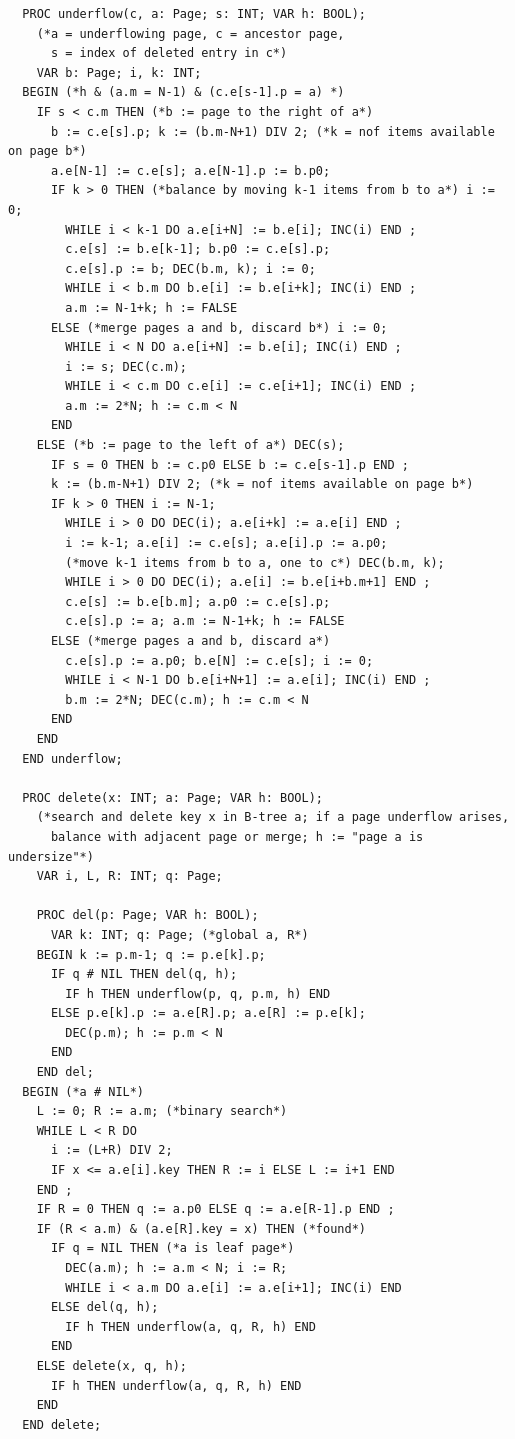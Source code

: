 \begin{verbatim}
  PROC underflow(c, a: Page; s: INT; VAR h: BOOL);
    (*a = underflowing page, c = ancestor page,
      s = index of deleted entry in c*)
    VAR b: Page; i, k: INT;
  BEGIN (*h & (a.m = N-1) & (c.e[s-1].p = a) *)
    IF s < c.m THEN (*b := page to the right of a*)
      b := c.e[s].p; k := (b.m-N+1) DIV 2; (*k = nof items available on page b*)
      a.e[N-1] := c.e[s]; a.e[N-1].p := b.p0;
      IF k > 0 THEN (*balance by moving k-1 items from b to a*) i := 0;
        WHILE i < k-1 DO a.e[i+N] := b.e[i]; INC(i) END ;
        c.e[s] := b.e[k-1]; b.p0 := c.e[s].p;
        c.e[s].p := b; DEC(b.m, k); i := 0;
        WHILE i < b.m DO b.e[i] := b.e[i+k]; INC(i) END ;
        a.m := N-1+k; h := FALSE
      ELSE (*merge pages a and b, discard b*) i := 0;
        WHILE i < N DO a.e[i+N] := b.e[i]; INC(i) END ;
        i := s; DEC(c.m);
        WHILE i < c.m DO c.e[i] := c.e[i+1]; INC(i) END ;
        a.m := 2*N; h := c.m < N
      END
    ELSE (*b := page to the left of a*) DEC(s);
      IF s = 0 THEN b := c.p0 ELSE b := c.e[s-1].p END ;
      k := (b.m-N+1) DIV 2; (*k = nof items available on page b*)
      IF k > 0 THEN i := N-1;
        WHILE i > 0 DO DEC(i); a.e[i+k] := a.e[i] END ;
        i := k-1; a.e[i] := c.e[s]; a.e[i].p := a.p0;
        (*move k-1 items from b to a, one to c*) DEC(b.m, k);
        WHILE i > 0 DO DEC(i); a.e[i] := b.e[i+b.m+1] END ;
        c.e[s] := b.e[b.m]; a.p0 := c.e[s].p;
        c.e[s].p := a; a.m := N-1+k; h := FALSE
      ELSE (*merge pages a and b, discard a*)
        c.e[s].p := a.p0; b.e[N] := c.e[s]; i := 0;
        WHILE i < N-1 DO b.e[i+N+1] := a.e[i]; INC(i) END ;
        b.m := 2*N; DEC(c.m); h := c.m < N
      END
    END
  END underflow;

  PROC delete(x: INT; a: Page; VAR h: BOOL);
    (*search and delete key x in B-tree a; if a page underflow arises,
      balance with adjacent page or merge; h := "page a is undersize"*)
    VAR i, L, R: INT; q: Page;

    PROC del(p: Page; VAR h: BOOL);
      VAR k: INT; q: Page; (*global a, R*)
    BEGIN k := p.m-1; q := p.e[k].p;
      IF q # NIL THEN del(q, h);
        IF h THEN underflow(p, q, p.m, h) END
      ELSE p.e[k].p := a.e[R].p; a.e[R] := p.e[k];
        DEC(p.m); h := p.m < N
      END
    END del;
  BEGIN (*a # NIL*)
    L := 0; R := a.m; (*binary search*)
    WHILE L < R DO
      i := (L+R) DIV 2;
      IF x <= a.e[i].key THEN R := i ELSE L := i+1 END
    END ;
    IF R = 0 THEN q := a.p0 ELSE q := a.e[R-1].p END ;
    IF (R < a.m) & (a.e[R].key = x) THEN (*found*)
      IF q = NIL THEN (*a is leaf page*)
        DEC(a.m); h := a.m < N; i := R;
        WHILE i < a.m DO a.e[i] := a.e[i+1]; INC(i) END
      ELSE del(q, h);
        IF h THEN underflow(a, q, R, h) END
      END
    ELSE delete(x, q, h);
      IF h THEN underflow(a, q, R, h) END
    END
  END delete;


\end{verbatim}

